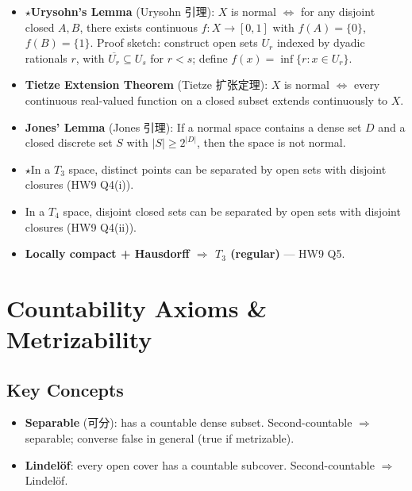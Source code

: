 \documentclass{article}
\newcommand{\starKey}{\textcolor{red!65!black}{\textbf{$\star$}}}
\begin{document}
\begin{itemize}
  \item \starKey \textbf{Urysohn's Lemma} (Urysohn 引理):
  $X$ is normal $\iff$ for any disjoint closed $A,B$, there exists continuous
  $f:X\to[0,1]$ with $f(A)=\{0\}$, $f(B)=\{1\}$.
  Proof sketch: construct open sets $U_r$ indexed by dyadic rationals $r$,
  with $\overline{U_r}\subseteq U_s$ for $r<s$; define $f(x)=\inf\{r:x\in U_r\}$.

  \item \textbf{Tietze Extension Theorem} (Tietze 扩张定理):
  $X$ is normal $\iff$ every continuous real-valued function on a closed subset
  extends continuously to $X$.

  \item \textbf{Jones' Lemma} (Jones 引理):
  If a normal space contains a dense set $D$ and a closed discrete set $S$
  with $|S|\ge 2^{|D|}$, then the space is not normal.

  \item \starKey In a $T_3$ space, distinct points can be separated by open sets
  with disjoint closures (HW9 Q4(i)).

  \item In a $T_4$ space, disjoint closed sets can be separated by open sets
  with disjoint closures (HW9 Q4(ii)).

  \item \textbf{Locally compact + Hausdorff $\Rightarrow$ $T_3$ (regular)} --- HW9 Q5.
\end{itemize}

\section{Countability Axioms \& Metrizability}

\subsection{Key Concepts}

\begin{itemize}
  \item \textbf{Separable} (可分): has a countable dense subset.
  Second-countable $\Rightarrow$ separable; converse false in general (true if metrizable).
  \item \textbf{Lindel\"of}: every open cover has a countable subcover.
  Second-countable $\Rightarrow$ Lindel\"of.
\end{itemize}
\end{document}
